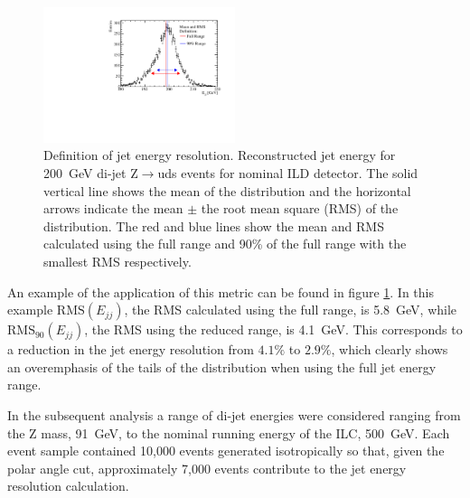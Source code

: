 \begin{figure}[h!]
\centering
\includegraphics[width=0.5\textwidth]{OptimisationStudies/Plots/MethodDescription/RMS90Plot.pdf}
\caption[Definition of jet energy resolution.   Reconstructed jet energy for 200~GeV di-jet Z$\rightarrow$uds events for nominal ILD detector.  The solid vertical line shows the mean of the distribution and the horizontal arrows indicate the mean $\pm$ the root mean square (RMS) of the distribution.  The red and blue lines represent the mean and RMS calculated using the full range and 90\% of the full range with the smallest RMS.]{Definition of jet energy resolution.   Reconstructed jet energy for 200~GeV di-jet Z$\rightarrow$uds events for nominal ILD detector.  The solid vertical line shows the mean of the distribution and the horizontal arrows indicate the mean $\pm$ the root mean square (RMS) of the distribution.  The red and blue lines show the mean and RMS calculated using the full range and 90\% of the full range with the smallest RMS respectively.}
\label{fig:rms90defintion}
\end{figure} 

An example of the application of this metric can be found in figure \ref{fig:rms90defintion}.  In this example $\text{RMS}(E_{jj})$, the RMS calculated using the full range, is 5.8~GeV, while $\text{RMS}_{90}(E_{jj})$, the RMS using the reduced range, is 4.1~GeV.  This corresponds to a reduction in the jet energy resolution from $4.1\%$ to $2.9\%$, which clearly shows an overemphasis of the tails of the distribution when using the full jet energy range.

In the subsequent analysis a range of di-jet energies were considered ranging from the Z mass, 91~GeV, to the nominal running energy of the ILC, 500~GeV.  Each event sample contained 10,000 events generated isotropically so that, given the polar angle cut, approximately 7,000 events contribute to the jet energy resolution calculation. 


